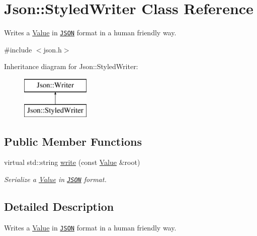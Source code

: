 \hypertarget{class_json_1_1_styled_writer}{\section{Json\-:\-:Styled\-Writer Class Reference}
\label{class_json_1_1_styled_writer}
}


Writes a \hyperlink{class_json_1_1_value}{Value} in \href{http://www.json.org}{\tt J\-S\-O\-N} format in a human friendly way.  




{\ttfamily \#include $<$json.\-h$>$}

Inheritance diagram for Json\-:\-:Styled\-Writer\-:\begin{figure}[H]
\begin{center}
\leavevmode
\includegraphics[height=2.000000cm]{class_json_1_1_styled_writer}
\end{center}
\end{figure}
\subsection*{Public Member Functions}
\begin{DoxyCompactItemize}
\item 
virtual std\-::string \hyperlink{class_json_1_1_styled_writer_a56f0fd80f60272b3f3c85690aae66e7d}{write} (const \hyperlink{class_json_1_1_value}{Value} \&root)
\begin{DoxyCompactList}\small\item\em Serialize a \hyperlink{class_json_1_1_value}{Value} in \href{http://www.json.org}{\tt J\-S\-O\-N} format. \end{DoxyCompactList}\end{DoxyCompactItemize}


\subsection{Detailed Description}
Writes a \hyperlink{class_json_1_1_value}{Value} in \href{http://www.json.org}{\tt J\-S\-O\-N} format in a human friendly way. 

